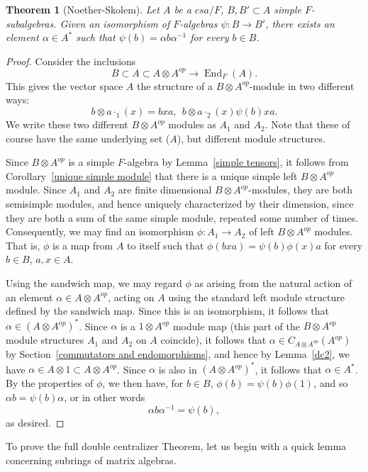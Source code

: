 \documentclass[12pt]{report}
\theoremstyle{plain}
\newtheorem{thm}{Theorem}[section]
\newcommand{\oper}[1]{\operatorname{#1}}
\newcommand{\End}{\oper{End}}
\begin{document}
\begin{thm}[Noether-Skolem]
Let $A$ be a $csa/F$, $B, B' \subset A$ simple $F$-subalgebras. Given an
isomorphism of $F$-algebras $\psi: B \to B'$, there exists an element $\alpha
\in A^*$ such that $\psi(b) = \alpha b \alpha^{-1}$ for every $b \in B$.
\end{thm}
\begin{proof}
Consider the inclusions
\[B \subset A \subset A \otimes A^{op} \to \End_F(A).\]
This gives the vector space $A$ the structure of a $B \otimes
A^{op}$-module in two different ways:
\[b \otimes a \cdot_1 (x) = bxa,  \ \ b \otimes a \cdot_2 (x) \psi(b) x
a.\]
We write these two different $B \otimes A^{op}$ modules as $A_1$ and $A_2$.
Note that these of course have the same underlying set ($A$), but different
module structures.

Since $B \otimes A^{op}$ is a simple $F$-algebra by Lemma~\ref{simple
tensors}, it follows from Corollary~\ref{unique simple module} that there
is a unique simple left $B \otimes A^{op}$ module. Since $A_1$ and $A_2$
are finite dimensional $B \otimes A^{op}$-modules, they are both semisimple
modules, and hence uniquely characterized by their dimension, since they
are both a sum of the same simple module, repeated some number of times.
Consequently, we may find an isomorphism $\phi: A_1 \to A_2$ of left $B
\otimes A^{op}$ modules. That is, $\phi$ is a map from $A$ to itself such
that $\phi(b x a) = \psi(b)\phi(x) a$ for every $b \in B$, $a, x \in A$.

Using the sandwich map, we may regard $\phi$ as
arising from the natural action of an element $\alpha \in A \otimes
A^{op}$, acting on $A$ using the standard left module structure defined by
the sandwich map. Since this is an isomorphism, it follows that $\alpha \in
(A \otimes A^{op})^*$. Since $\alpha$ is a $1 \otimes A^{op}$ module map
(this part of the $B \otimes A^{op}$ module structures $A_1$ and $A_2$ on
$A$ coincide), it follows that $\alpha \in C_{A \otimes A^{op}}(A^{op})$ by
Section~\ref{commutators and endomorphisms}, and hence by Lemma~\ref{dc2},
we have $\alpha \in A \otimes 1 \subset A \otimes A^{op}$. Since $\alpha$
is also in $(A \otimes A^{op})^*$, it follows that $\alpha \in A^*$. By
the properties of $\phi$, we then have, for $b \in B$, $\phi(b) = \psi(b)
\phi(1)$, and so $\alpha b = \psi(b) \alpha$, or in other words
\[\alpha b \alpha^{-1} = \psi(b),\]
as desired.
\end{proof}

To prove the full double centralizer Theorem, let us begin with a quick
lemma concerning subrings of matrix algebras.
\end{document}
